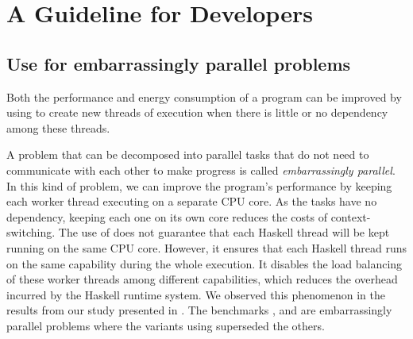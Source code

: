 \chapter{A Guideline for Developers}
\lipsum[1-2]


\section{Use \forkOn for embarrassingly parallel problems}
 Both the performance and energy consumption of a program can be improved by using \forkOn to create new threads of execution when there is little or no dependency among these threads.
\newline

 A problem that can be decomposed into parallel tasks that do not need to communicate with each other to make progress is called \emph{embarrassingly parallel}. In this kind of problem, we can improve the program's performance by keeping each worker thread executing on a separate CPU core. As the tasks have no dependency, keeping each one on its own core reduces the costs of context-switching. The use of \forkOn does not guarantee that each Haskell thread will be kept running on the same CPU core. However, it ensures that each Haskell thread runs on the same capability during the whole execution. It disables the load balancing of these worker threads among different capabilities, which reduces the overhead incurred by the Haskell runtime system. We observed this phenomenon in the results from our study presented in . The benchmarks \mandelbrot, \regex and \spectral are embarrassingly parallel problems where the variants using \forkOn superseded the others.

